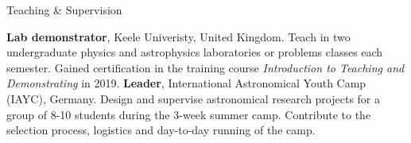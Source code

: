 \begin{rubric}{Teaching \& Supervision}

%
    \textbf{Lab demonstrator}, Keele Univeristy, United Kingdom. Teach in two undergraduate physics and astrophysics laboratories or problems classes each semester. Gained certification in the training course \emph{Introduction to Teaching and Demonstrating} in 2019.
%
    \textbf{Leader}, International Astronomical Youth Camp (IAYC), Germany. Design and supervise astronomical research projects for a group of 8-10 students during the 3-week summer camp. Contribute to the selection process, logistics and day-to-day running of the camp.%
    
\end{rubric}